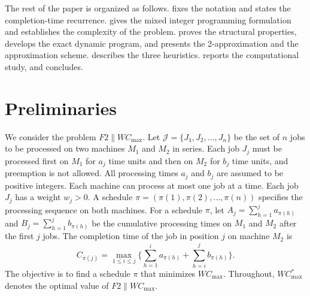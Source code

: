 \documentclass[12pt]{article}
\let\origsection\section
\renewcommand{\section}{\FloatBarrier\origsection}
\begin{document}
\begin{sloppypar}
The rest of the paper is organized as follows.  fixes
the notation and states the completion-time recurrence.
 gives the mixed integer programming formulation and
establishes the complexity of the problem.  proves the
structural properties, develops the exact dynamic program, and presents the
2-approximation and the approximation scheme.  describes
the three heuristics.  reports the computational study,
and  concludes.

\section{Preliminaries}
\label{sec:preliminaries}

We consider the problem $F2 \parallel W C_{\max}$.
Let $\mathcal{J} = \{J_1, J_2, \dots, J_n\}$ be the set of $n$ jobs to be processed on two machines $M_1$ and $M_2$ in series.
Each job $J_j$ must be processed first on $M_1$ for $a_j$ time units and then on $M_2$ for $b_j$ time units, and preemption is not allowed.
All processing times $a_j$ and $b_j$ are assumed to be positive integers.
Each machine can process at most one job at a time.
Each job $J_j$ has a weight $w_j > 0$.
A schedule $\pi = (\pi(1), \pi(2), \dots, \pi(n))$ specifies the processing sequence on both machines.
For a schedule $\pi$, let $A_j = \sum_{h=1}^{j} a_{\pi(h)}$ and $B_j = \sum_{h=1}^{j} b_{\pi(h)}$
be the cumulative processing times on $M_1$ and $M_2$ after the first $j$ jobs. The completion time
of the job in position $j$ on machine $M_2$ is
\begin{equation}\label{eq:completion}
C_{\pi(j)} = \max_{1\le i\le j}\Big\{\sum_{h=1}^{i}a_{\pi(h)} + \sum_{h=i}^{j}b_{\pi(h)}\Big\}.
\end{equation}
The objective is to find a schedule $\pi$ that minimizes $W C_{\max}$.
Throughout, $W C_{\max}^{*}$ denotes the optimal value of $F2 \parallel W C_{\max}$.



\end{sloppypar}
\end{document}
